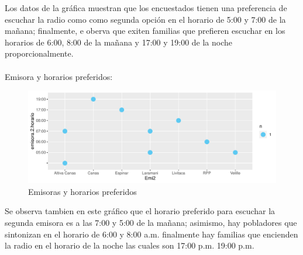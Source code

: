 \documentclass[12pt]{article}\usepackage[]{graphicx}\usepackage[]{xcolor}
\makeatletter
\def\maxwidth{ %
  \ifdim\Gin@nat@width>\linewidth
    \linewidth
  \else
    \Gin@nat@width
  \fi
}
\newenvironment{knitrout}{}{} %
\makeatother
\begin{document}
	Los datos de la gráfica muestran que los encuestados tienen una preferencia de escuchar la radio como como segunda opción en el horario de 5:00 y 7:00 de la mañana; finalmente, e oberva que exiten familias que prefieren escuchar en los horarios de 6:00, 8:00 de la mañana y 17:00 y 19:00 de la noche proporcionalmente.\\
	\\
	Emisora y horarios preferidos: 
	\begin{figure}[H]
	\centering
\begin{knitrout}
\color{fgcolor}
\includegraphics[width=\maxwidth]{figure/six-1} 
\end{knitrout}
	\caption{Emisoras y horarios preferidos}
	\end{figure}
	Se observa tambien en este gráfico que el horario preferido para escuchar la segunda emisora es a las 7:00 y 5:00 de la mañana; asimismo, hay pobladores que sintonizan en el horario de 6:00 y 8:00 a.m. finalmente hay familias que encienden la radio en el horario de la noche las cuales son 17:00 p.m.  19:00 p.m.
	
	
\end{document}
